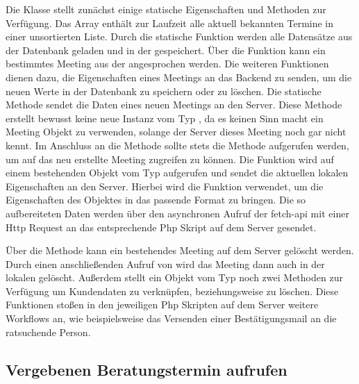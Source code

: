 Die Klasse  stellt zunächst einige statische Eigenschaften und
Methoden zur Verfügung. Das Array  enthält zur Laufzeit alle
aktuell bekannten Termine in einer unsortierten Liste. Durch die statische
Funktion  werden alle Datensätze aus der Datenbank
geladen und in der  gespeichert. Über die Funktion
 kann ein bestimmtes Meeting aus der 
angesprochen werden. Die weiteren Funktionen dienen dazu, die Eigenschaften
eines Meetings an das Backend zu senden, um die neuen Werte in der Datenbank zu
speichern oder zu löschen. Die statische Methode
 sendet die Daten eines neuen Meetings an den
Server. Diese Methode erstellt bewusst keine neue Instanz vom Typ
, da es keinen Sinn macht ein Meeting Objekt zu verwenden,
solange der Server dieses Meeting noch gar nicht kennt. Im Anschluss an die
 Methode sollte stets die Methode
 aufgerufen werden, um auf das neu erstellte Meeting
zugreifen zu können. Die Funktion  wird auf einem
bestehenden Objekt vom Typ  aufgerufen und sendet die aktuellen
lokalen Eigenschaften an den Server. Hierbei wird die Funktion
 verwendet, um die Eigenschaften des Objektes in das
passende Format zu bringen. Die so aufbereiteten Daten werden über den
asynchronen Aufruf der \gls{fetch-api} mit einer Http Request an das
entsprechende Php Skript auf dem Server gesendet.



Über die Methode  kann ein bestehendes Meeting auf dem Server gelöscht werden. Durch einen anschließenden Aufruf von  wird das Meeting dann auch in der lokalen  gelöscht. Außerdem stellt ein Objekt vom Typ  noch zwei Methoden zur Verfügung um Kundendaten zu verknüpfen, beziehungsweise zu löschen. Diese Funktionen stoßen in den jeweiligen Php Skripten auf dem Server weitere Workflows an, wie beispielsweise das Versenden einer Bestätigungsmail an die ratsuchende Person.





\subsection*{Vergebenen Beratungstermin aufrufen}

